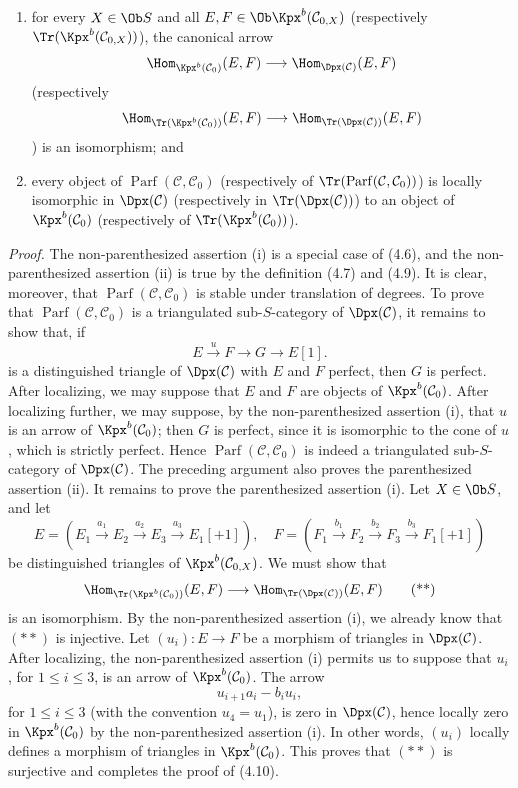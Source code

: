 \documentclass[11pt]{article}
\newcommand{\Parf}{\operatorname{Parf}}
\begin{document}
\begin{enumerate}[label=(\roman*)]
\item for every \(X\in\Ob S\) and all \(E,F\in\Ob\Kpx^b(\mathcal C_{0,X})\) (respectively \(\Tr(\Kpx^b(\mathcal C_{0,X}))\)), the canonical arrow
\[
  \Hom_{\Kpx^b(\mathcal C_0)}(E,F)
  \longrightarrow
  \Hom_{\Dpx(\mathcal C)}(E,F)
\]
(respectively
\[
  \Hom_{\Tr(\Kpx^b(\mathcal C_0))}(E,F)
  \longrightarrow
  \Hom_{\Tr(\Dpx(\mathcal C))}(E,F)
\]) is an isomorphism; and
\item every object of \(\Parf(\mathcal C,\mathcal C_0)\) (respectively of \(\Tr(\Parf(\mathcal C,\mathcal C_0))\)) is locally isomorphic in \(\Dpx(\mathcal C)\) (respectively in \(\Tr(\Dpx(\mathcal C))\)) to an object of \(\Kpx^b(\mathcal C_0)\) (respectively of \(\Tr(\Kpx^b(\mathcal C_0))\)).
\end{enumerate}

\emph{Proof.} The non-parenthesized assertion (i) is a special case of (4.6), and the non-parenthesized assertion (ii) is true by the definition (4.7) and (4.9). It is clear, moreover, that \(\Parf(\mathcal C,\mathcal C_0)\) is stable under translation of degrees. To prove that \(\Parf(\mathcal C,\mathcal C_0)\) is a triangulated sub-\(S\)-category of \(\Dpx(\mathcal C)\), it remains to show that, if
\[
  E\xrightarrow{u}F\longrightarrow G\longrightarrow E[1].
  \tag{*}
\]
is a distinguished triangle of \(\Dpx(\mathcal C)\) with \(E\) and \(F\) perfect, then \(G\) is perfect. After localizing, we may suppose that \(E\) and \(F\) are objects of \(\Kpx^b(\mathcal C_0)\). After localizing further, we may suppose, by the non-parenthesized assertion (i), that \(u\) is an arrow of \(\Kpx^b(\mathcal C_0)\); then \(G\) is perfect, since it is isomorphic to the cone of \(u\), which is strictly perfect. Hence \(\Parf(\mathcal C,\mathcal C_0)\) is indeed a triangulated sub-\(S\)-category of \(\Dpx(\mathcal C)\). The preceding argument also proves the parenthesized assertion (ii). It remains to prove the parenthesized assertion (i). Let \(X\in\Ob S\), and let
\[
E=(E_1\xrightarrow{a_1}E_2\xrightarrow{a_2}E_3\xrightarrow{a_3}E_1[+1]),
\quad
F=(F_1\xrightarrow{b_1}F_2\xrightarrow{b_2}F_3\xrightarrow{b_3}F_1[+1])
\]
be distinguished triangles of \(\Kpx^b(\mathcal C_{0,X})\). We must show that
\[
  \Hom_{\Tr(\Kpx^b(\mathcal C_0))}(E,F)
  \longrightarrow
  \Hom_{\Tr(\Dpx(\mathcal C))}(E,F)
  \tag{**}
\]
is an isomorphism. By the non-parenthesized assertion (i), we already know that \((**)\) is injective. Let \((u_i):E\to F\) be a morphism of triangles in \(\Dpx(\mathcal C)\). After localizing, the non-parenthesized assertion (i) permits us to suppose that \(u_i\), for \(1\leq i\leq3\), is an arrow of \(\Kpx^b(\mathcal C_0)\). The arrow
\[
  u_{i+1}a_i-b_iu_i,
\]
for \(1\leq i\leq3\) (with the convention \(u_4=u_1\)), is zero in \(\Dpx(\mathcal C)\), hence locally zero in \(\Kpx^b(\mathcal C_0)\) by the non-parenthesized assertion (i). In other words, \((u_i)\) locally defines a morphism of triangles in \(\Kpx^b(\mathcal C_0)\). This proves that \((**)\) is surjective and completes the proof of (4.10).
\end{document}
